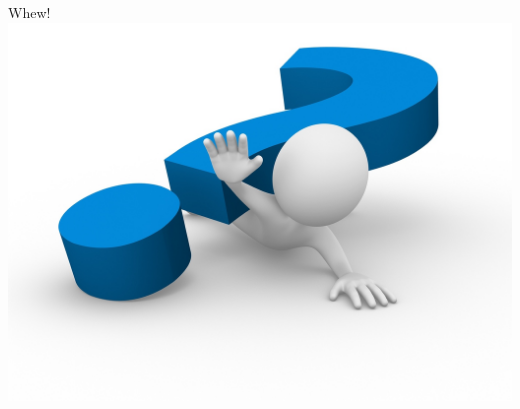\documentclass[8pt,xcolor=dvipnames]{beamer}
\begin{document}
\begin{frame}{Whew!}
\centering
\includegraphics[scale=0.2]{figures/question_mark.jpg}

\end{frame}



\end{document}
